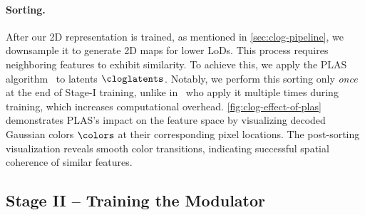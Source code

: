     \paragraph{Sorting.}
      After our 2D representation is trained, as mentioned in
      \cref{sec:clog-pipeline}, we downsample it to generate 2D maps for lower LoDs.
      This process requires neighboring features to exhibit similarity.
      To achieve this, we apply the PLAS algorithm~\cite{morgenstern2024compact} to
      latents $\cloglatents$.
      Notably, we perform this sorting only \emph{once} at the end of Stage-I
      training, unlike in~\cite{morgenstern2024compact} who apply it multiple
      times during training, which increases computational overhead.
      \cref{fig:clog-effect-of-plas} demonstrates PLAS's impact on the feature space by visualizing decoded Gaussian colors $\colors$ at their corresponding pixel locations.
      The post-sorting visualization reveals smooth color transitions, indicating
      successful spatial coherence of similar features.

      
  \subsection{Stage II -- Training the Modulator}

